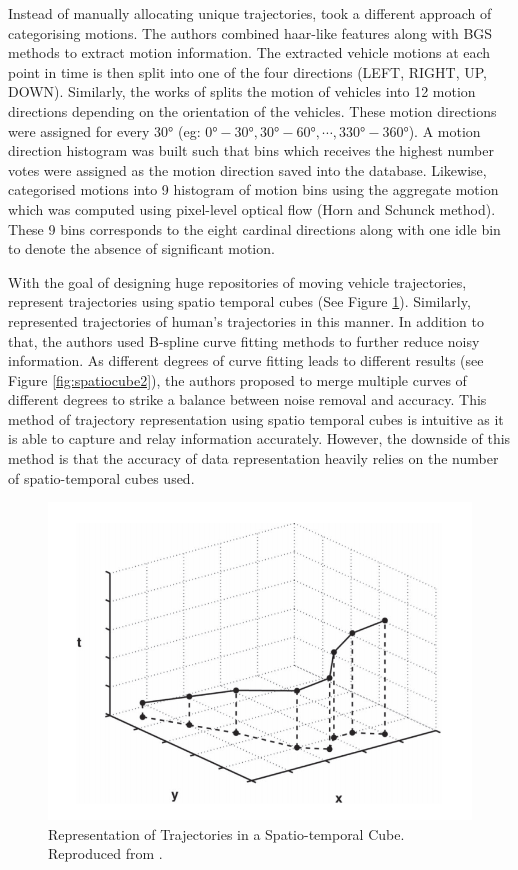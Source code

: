 Instead of manually allocating unique trajectories, 
took a different approach of categorising motions. The authors combined
haar-like features along with BGS methods to extract motion information. The
extracted vehicle motions at each point in time is then split into one of the
four directions (LEFT, RIGHT, UP, DOWN). Similarly, the works of
 splits the motion of vehicles into 12 motion directions
depending on the orientation of the vehicles. These motion directions were
assigned for every $\ang{30}$ (eg: $\ang{0}-\ang{30}, \ang{30}-\ang{60}, \cdots,
\ang{330}-\ang{360}$). A motion direction histogram was built such that bins
which receives the highest number votes were assigned as the motion direction
saved into the database. Likewise,  categorised
motions into 9 histogram of motion bins using the aggregate motion which was
computed using pixel-level optical flow (Horn and Schunck method). These 9 bins
corresponds to the eight cardinal directions along with one idle bin to denote
the absence of significant motion.


With the goal of designing huge repositories of moving vehicle trajectories,
 represent trajectories using spatio temporal cubes (See
Figure \ref{fig:spatiocube}). Similarly,  represented
trajectories of human's trajectories in this manner. In addition to that, the
authors used B-spline curve fitting methods to further reduce noisy information.
As different degrees of curve fitting leads to different results (see Figure
\ref{fig:spatiocube2}), the authors proposed to merge multiple curves of
different degrees to strike a balance between noise removal and accuracy. This
method of trajectory representation using spatio temporal cubes is intuitive as
it is able to capture and relay information accurately. However, the downside
of this method is that the accuracy of data representation heavily relies on the
number of spatio-temporal cubes used.

\begin{figure}[hbt!]
  \centering
  \includegraphics[width=.5\textwidth]{image/lit/spatiotemporal.PNG}
  \caption[Representation of Trajectories in a Spatio-temporal Cube]
 {Representation of Trajectories in a Spatio-temporal Cube. Reproduced from
 .}
  \label{fig:spatiocube}
\end{figure}

